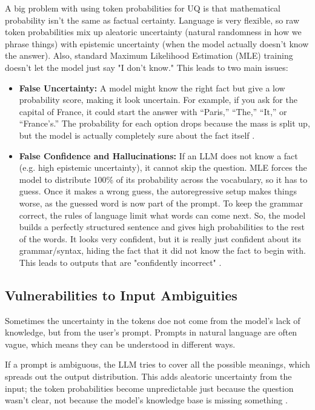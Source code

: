 \documentclass{article}
\begin{document}
A big problem with using token probabilities for UQ is that mathematical probability isn't the same as factual certainty. Language is very flexible, so raw token probabilities mix up aleatoric uncertainty (natural randomness in how we phrase things) with epistemic uncertainty (when the model actually doesn't know the answer). Also, standard Maximum Likelihood Estimation (MLE) training doesn't let the model just say "I don't know." This leads to two main issues:

\begin{itemize}
    \item \textbf{False Uncertainty:} A model might know the right fact but give a low probability score, making it look uncertain. For example, if you ask for the capital of France, it could start the answer with ``Paris,'' ``The,'' ``It,'' or ``France's.'' The probability for each option drops because the mass is split up, but the model is actually completely sure about the fact itself \cite{nikitin2024kernellanguageentropyfinegrained}.
    \item \textbf{False Confidence and Hallucinations:} If an LLM does not know a fact (e.g. high epistemic uncertainty), it cannot skip the question. MLE forces the model to distribute 100\% of its probability across the vocabulary, so it has to guess. Once it makes a wrong guess, the autoregressive setup makes things worse, as the guessed word is now part of the prompt. To keep the grammar correct, the rules of language limit what words can come next. So, the model builds a perfectly structured sentence and gives high probabilities to the rest of the words. It looks very confident, but it is really just confident about its grammar/syntax, hiding the fact that it did not know the fact to begin with. This leads to outputs that are "confidently incorrect" \cite{kadavath2022languagemodelsmostlyknow}.
\end{itemize}

\subsection*{Vulnerabilities to Input Ambiguities}

Sometimes the uncertainty in the tokens doe not come from the model's lack of knowledge, but from the user's prompt. Prompts in natural language are often vague, which means they can be understood in different ways. 

If a prompt is ambiguous, the LLM tries to cover all the possible meanings, which spreads out the output distribution. This adds aleatoric uncertainty from the input; the token probabilities become unpredictable just because the question wasn't clear, not because the model's knowledge base is missing something \cite{min-etal-2020-ambigqa}.
\end{document}
